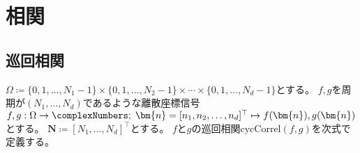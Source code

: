 \part{相関}
    \chapter{巡回相関}
        \newcommand{\cycCorrel}[2]{\mathrm{cycCorrel}\left(#1,#2\right)}
        $\Omega \coloneqq \{0,1,\dots,N_1-1\}\times\{0,1,\dots,N_2-1\}\times\cdots\times\{0,1,\dots,N_d-1\}$とする。
        $f,g$を周期が$(N_1,\dots,N_d)$であるような離散座標信号$f,g: \Omega\to\complexNumbers;\;\bm{n} = [n_1,n_2,\dots,n_d]^\top \mapsto f(\bm{n}),g(\bm{n})$とする。
        $\bm{N} \coloneqq [N_1,\dots,N_d]^\top$とする。
        $f$と$g$の巡回相関$\cycCorrel{f}{g}$を次式で定義する。